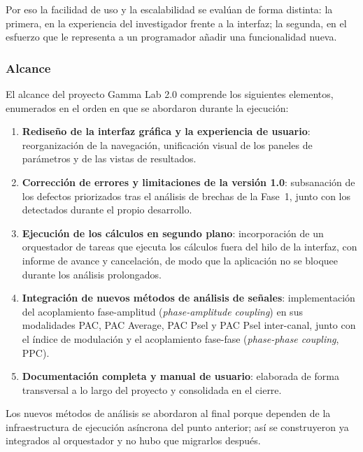 \documentclass{article}
\begin{document}
Por eso la facilidad de uso y la escalabilidad se evalúan de forma distinta: la primera, en la experiencia del investigador frente a la interfaz; la segunda, en el esfuerzo que le representa a un programador añadir una funcionalidad nueva.
 
\subsubsection{Alcance}
 
El alcance del proyecto Gamma Lab 2.0 comprende los siguientes elementos, enumerados en el orden en que se abordaron durante la ejecución:
 
\begin{enumerate}
    \item \textbf{Rediseño de la interfaz gráfica y la experiencia de usuario}: reorganización de la navegación, unificación visual de los paneles de parámetros y de las vistas de resultados.

    \item \textbf{Corrección de errores y limitaciones de la versión 1.0}: subsanación de los defectos priorizados tras el análisis de brechas de la Fase~1, junto con los detectados durante el propio desarrollo.

    \item \textbf{Ejecución de los cálculos en segundo plano}: incorporación de un orquestador de tareas que ejecuta los cálculos fuera del hilo de la interfaz, con informe de avance y cancelación, de modo que la aplicación no se bloquee durante los análisis prolongados.

    \item \textbf{Integración de nuevos métodos de análisis de señales}: implementación del acoplamiento fase-amplitud (\textit{phase-amplitude coupling}) en sus modalidades PAC, PAC Average, PAC Psel y PAC Psel inter-canal, junto con el índice de modulación y el acoplamiento fase-fase (\textit{phase-phase coupling}, PPC).

    \item \textbf{Documentación completa y manual de usuario}: elaborada de forma transversal a lo largo del proyecto y consolidada en el cierre.
\end{enumerate}
 
Los nuevos métodos de análisis se abordaron al final porque dependen de la infraestructura de ejecución asíncrona del punto anterior; así se construyeron ya integrados al orquestador y no hubo que migrarlos después.
 
\end{document}
